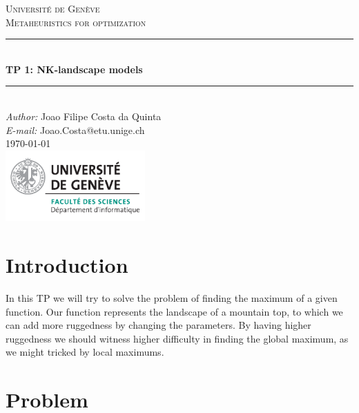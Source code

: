 \documentclass[a4paper]{article}
\makeatletter
\newcommand\TPid{1}
\newcommand\TPname{NK-landscape models}
\newcommand\Firstname{Joao Filipe}
\newcommand\Familyname{Costa da Quinta}
\newcommand\Email{Joao.Costa@etu.unige.ch}
\makeatother
\begin{document}
\begin{titlepage}

\newcommand{\HRule}{\rule{\linewidth}{0.5mm}} 							%

\center 
 
\textsc{\LARGE Université de Genève}\\[1cm]

\textsc{\Large Metaheuristics for optimization}\\[0.2cm]									%
\HRule \\[0.8cm]
{ \huge \bfseries TP \TPid : \TPname}\\[0.7cm]								%
\HRule \\[2cm]
\large
\emph{Author:} \Firstname \; \Familyname\\[0.5cm]		
\emph{E-mail:} {\color{blue}\Email}\\[7cm]		
{\large \today}\\[2cm]
\includegraphics[width=0.4\textwidth]{images/unige_csd.png}\\[1cm] 	%
\vfill 
\end{titlepage}


\newpage
\section{Introduction}
In this TP we will try to solve the problem of finding the maximum of a given function. Our function represents the landscape of a mountain top, to which we can add more ruggedness by changing the parameters. By having higher ruggedness we should witness higher difficulty in finding the global maximum, as we might tricked by local maximums.\\

\section{Problem}
\end{document}
